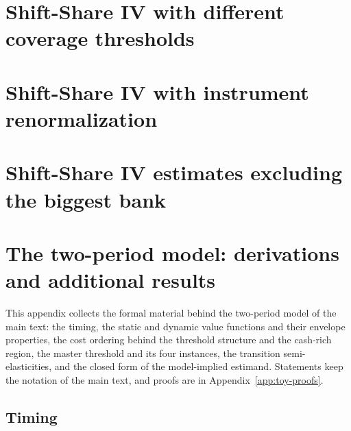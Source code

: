 \documentclass[12pt]{article}
\begin{document}
\section{Shift-Share IV with different coverage thresholds} \label{sensitivity}

\begin{table}[H]
    \caption{Sensitivity to instrument coverage threshold}
    \label{sensitivity_table}
    \centering
    \small
    
\end{table}

\section{Shift-Share IV with instrument renormalization} \label{renormalized}

\begin{table}[H]
    \caption{Robustness to instrument renormalization}
    \label{renormalized_table}
    \centering
    \small
    
\end{table}

\section{Shift-Share IV estimates excluding the biggest bank} \label{drop_top_bank_section}

\begin{table}[H]
    \caption{Shift-Share IV estimates excluding the biggest bank}
    \label{drop_top_bank_table}
    \centering
    \small
    
\end{table}

\section{The two-period model: derivations and additional results}
\label{app:toy-details}
This appendix collects the formal material behind the two-period model of the main text: the timing, the static and dynamic value functions and their envelope properties, the cost ordering behind the threshold structure and the cash-rich region, the master threshold and its four instances, the transition semi-elasticities, and the closed form of the model-implied estimand. Statements keep the notation of the main text, and proofs are in Appendix~\ref{app:toy-proofs}.

\subsection{Timing}
\end{document}
